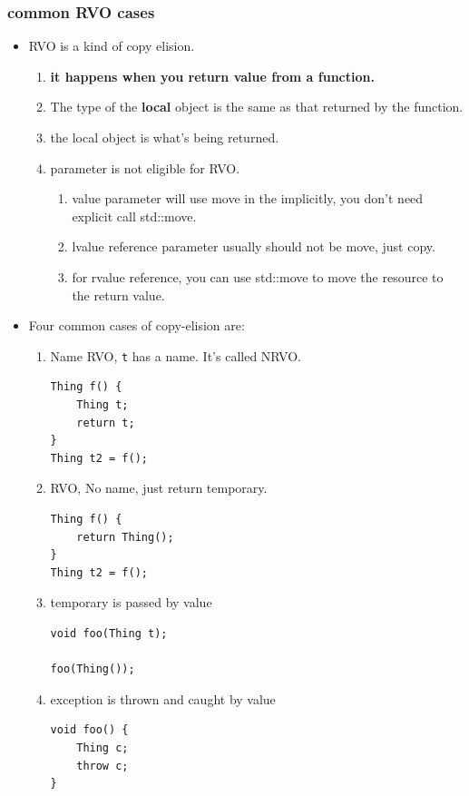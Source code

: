 \documentclass[a4paper,11pt,twoside]{book}
\begin{document}
\subsubsection{common RVO cases}
\begin{itemize}
	\item RVO is a kind of copy elision. 
	\begin{enumerate}
		\item \textbf{it happens when you return value from a function.}
		\item The type of the \textbf{local} object is the same as that returned by the function.
		\item the local object is what's being returned.
		\item parameter is not eligible for RVO. 
		\begin{enumerate}
			\item value parameter will use move in the implicitly, you don't need explicit call std::move.
			\item lvalue reference parameter usually should not be move, just copy.
			\item for rvalue reference, you can use std::move to move the resource to the return value.
		\end{enumerate}
	\end{enumerate}
	
	\item Four common cases of copy-elision are:
	\begin{enumerate}
		\item Name RVO, \texttt{t} has a name. It's called NRVO.
\begin{lstlisting}[numbers=none]
Thing f() {
	Thing t;
	return t;
}
Thing t2 = f();
\end{lstlisting}

		\item RVO, No name, just return temporary.
\begin{lstlisting}[numbers=none]
Thing f() {
	return Thing();
}
Thing t2 = f();
\end{lstlisting}

		\item temporary is passed by value
\begin{lstlisting}[numbers=none]
void foo(Thing t);

foo(Thing());
\end{lstlisting}

\item exception is thrown and caught by value
\begin{lstlisting}[numbers=none]
void foo() {
	Thing c;
	throw c;
}


\end{lstlisting}
\end{enumerate}
\end{itemize}
\end{document}
